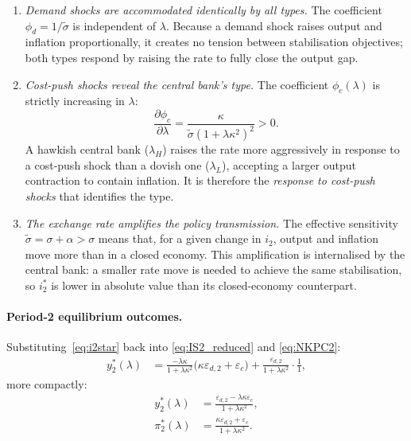 \begin{enumerate}[label=(\roman*)]
  \item \textit{Demand shocks are accommodated identically by all types.}
        The coefficient $\phi_d = 1/\tilde{\sigma}$ is independent of $\lambda$.
        Because a demand shock raises output and inflation proportionally, it creates
        no tension between stabilisation objectives; both types respond by raising the
        rate to fully close the output gap.

  \item \textit{Cost-push shocks reveal the central bank's type.}
        The coefficient $\phi_c(\lambda)$ is strictly increasing in $\lambda$:
        \begin{equation}
          \frac{\partial\phi_c}{\partial\lambda}
            = \frac{\kappa}{\tilde{\sigma}(1+\lambda\kappa^2)^2} > 0.
          \label{eq:dphi_dlambda}
        \end{equation}
        A hawkish central bank ($\lambda_H$) raises the rate more aggressively in
        response to a cost-push shock than a dovish one ($\lambda_L$), accepting a
        larger output contraction to contain inflation. It is therefore the
        \emph{response to cost-push shocks} that identifies the type.

  \item \textit{The exchange rate amplifies the policy transmission.}
        The effective sensitivity $\tilde{\sigma} = \sigma + \alpha > \sigma$ means
        that, for a given change in $i_2$, output and inflation move more than in a
        closed economy. This amplification is internalised by the central bank: a
        smaller rate move is needed to achieve the same stabilisation, so $i_2^*$ is
        lower in absolute value than its closed-economy counterpart.
\end{enumerate}

\paragraph{Period-2 equilibrium outcomes.}
Substituting~\eqref{eq:i2star} back into \eqref{eq:IS2_reduced} and \eqref{eq:NKPC2}:
\begin{align}
  y_2^*(\lambda) &= \frac{-\lambda\kappa}{1+\lambda\kappa^2}
    \bigl(\kappa\varepsilon_{d,2} + \varepsilon_c\bigr)
    + \frac{\varepsilon_{d,2}}{1 + \lambda\kappa^2} \cdot \frac{1}{1},
  \label{eq:y2star}
\end{align}
more compactly:
\begin{align}
  y_2^*(\lambda)   &= \frac{\varepsilon_{d,2} - \lambda\kappa\varepsilon_c}{1+\lambda\kappa^2},
  \label{eq:y2star_clean}\\[4pt]
  \pi_2^*(\lambda) &= \frac{\kappa\varepsilon_{d,2} + \varepsilon_c}{1+\lambda\kappa^2}.
  \label{eq:pi2star_clean}
\end{align}

